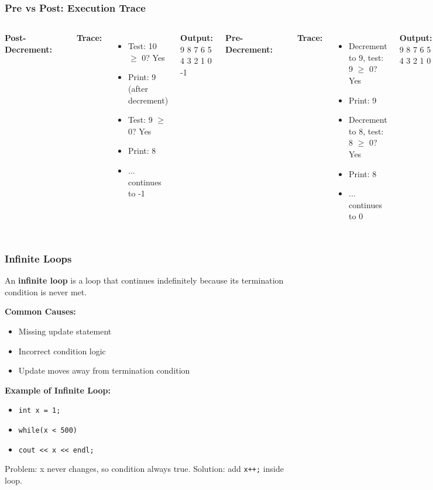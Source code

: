 \documentclass{beamer}
\begin{document}
\begin{frame}[fragile]
\frametitle{Pre vs Post: Execution Trace}
\begin{columns}[t]
\textbf{Post-Decrement:}
\begin{verbatim}
int countDown = 10;
while(countDown-- >= 0) {
    cout << countDown << '\n';
}
\end{verbatim}
\textbf{Trace:}
\begin{itemize}
\item Test: 10 $\geq$ 0? Yes
\item Print: 9 (after decrement)
\item Test: 9 $\geq$ 0? Yes
\item Print: 8
\item ... continues to -1
\end{itemize}
\textbf{Output:} 9 8 7 6 5 4 3 2 1 0 -1

\textbf{Pre-Decrement:}
\begin{verbatim}
int countDown = 10;
while(--countDown >= 0) {
    cout << countDown << '\n';
}
\end{verbatim}
\textbf{Trace:}
\begin{itemize}
\item Decrement to 9, test: 9 $\geq$ 0? Yes
\item Print: 9
\item Decrement to 8, test: 8 $\geq$ 0? Yes
\item Print: 8
\item ... continues to 0
\end{itemize}
\textbf{Output:} 9 8 7 6 5 4 3 2 1 0
\end{columns}
\end{frame}

\begin{frame}
\frametitle{Infinite Loops}
An \textbf{infinite loop} is a loop that continues indefinitely because its termination condition is never met.

\textbf{Common Causes:}
\begin{itemize}
\item Missing update statement
\pause
\item Incorrect condition logic
\pause
\item Update moves away from termination condition
\end{itemize}

\textbf{Example of Infinite Loop:}
\begin{itemize}
\item \texttt{int x = 1;}
\item \texttt{while(x < 500)}
\item \texttt{cout << x << endl;}
\end{itemize}

Problem: x never changes, so condition always true. Solution: add \texttt{x++;} inside loop.
\end{frame}
\end{document}
